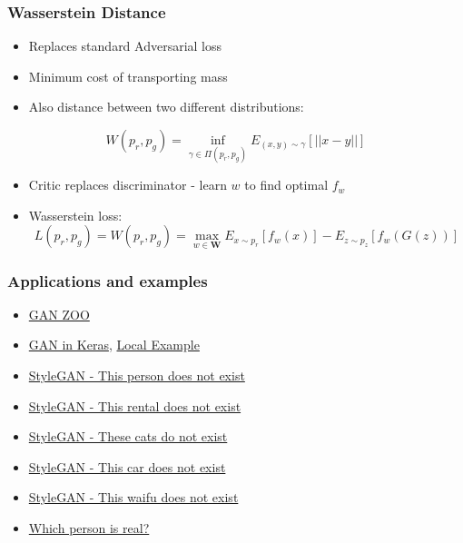\begin{frame}
\frametitle{Wasserstein Distance}
\begin{itemize}
	\item Replaces standard Adversarial loss
	\item Minimum cost of transporting mass
	\item Also distance between two different distributions:
\end{itemize}
\begin{equation}
W(p_r, p_g) = \inf_{\gamma\in\Pi(p_r,p_g)}E_{(x,y)\sim\gamma}[||x-y||]
\end{equation}
\begin{itemize}
	\item Critic replaces discriminator - learn $w$ to find optimal $f_w$
	\item Wasserstein loss:
\begin{equation}
L(p_r,p_g) = W(p_r, p_g) = \max_{w\in\boldsymbol{W}}E_{x\sim p_r}[f_w(x)]-E_{z\sim p_z}[f_w(G(z))]
\end{equation}
\end{itemize}
\end{frame}

\begin{frame}
\frametitle{Applications and examples}
\begin{itemize}
	\item \href{https://github.com/hindupuravinash/the-gan-zoo}{GAN ZOO}
	\item \href{https://machinelearningmastery.com/how-to-develop-a-generative-adversarial-network-for-an-mnist-handwritten-digits-from-scratch-in-keras/}{GAN in Keras}, \href{C:/Python36/Scripts/MPV}{Local Example}
	\item \href{https://thispersondoesnotexist.com/}{StyleGAN - This person does not exist}
	\item \href{https://thisrentaldoesnotexist.com/}{StyleGAN - This rental does not exist}
	\item \href{http://thesecatsdonotexist.com/}{StyleGAN - These cats do not exist}
	\item \href{https://thiscardoesnotexist.glitch.me/}{StyleGAN - This car does not exist}
	\item \href{https://www.thiswaifudoesnotexist.net/}{StyleGAN - This waifu does not exist}
	\item \href{http://www.whichfaceisreal.com/index.php}{Which person is real?}
\end{itemize}

\end{frame}

